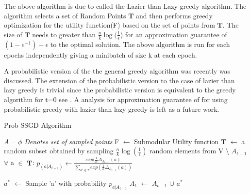 \documentclass[a4paper,twoside]{iiththesis}
\theoremstyle{definition}
\theoremstyle{definition}
\theoremstyle{remark}
\begin{document}
The above algorithm is due to \cite{mirzasoleiman2015lazier} called the Lazier than Lazy greedy algorithm. The algorithm selects a set of Random Points $\mathbf{T}$ and then performs greedy optimization for the utility function(F) based on the set of points from $\mathbf{T}$. The size of  $\mathbf{T}$ needs to greater than $\frac{n}{k} \log(\frac{1}{\epsilon}$)  for an approximation guarantee  of $(1 - e^{-1}) - \epsilon$ to the optimal solution. The above algorithm is run for each epochs independently giving a minibatch of size k at each epoch. 

A probabilistic version of the the general greedy algorithm was recently  \cite{tschiatschek2018differentiable} was discussed. The extension of the probabilistic  version to the case of lazier than lazy greedy is trivial since the probabilistic version is equivalent to the greedy algorithm for t=0 see \cite{tschiatschek2018differentiable}. A analysis for approximation guarantee of  for using probabilistic greedy with lazier than lazy greedy is left as a future work.
\begin{algorithm}[!htb]
\caption{Prob SSGD Algorithm}
\label{sSGD-2}
\begin{algorithmic}[1]
\State $A= \phi$ \Comment \textit{Denotes set of sampled points}
\State  F $\leftarrow$ Submodular Utility function
	\State $\mathbf{T}  $ $\leftarrow$ a random subset obtained by sampling $\frac{n}{k} \log(\frac{1}{\epsilon})$ random
	elements from V $\setminus$ $A_{t-1}$
    \State $\forall$ a $\in$ $\mathbf{T}$: 
    \State 
    $p_{(a | A_{t-1})} \leftarrow \frac{exp(\frac{1}{\alpha} \Delta_{A_{t-1}}(a)} {\sum_{a' \in T} exp(\frac{1}{\alpha} \Delta_{A_{t-1}}(a))}$ \label{prob eq}
   
	\State $a^*$ $\leftarrow$ Sample 'a' with probability $p_{a|A_{t-1}}$
    \State  $A_{t}$ $\leftarrow$ $A_{t-1}$ $\cup$ $a^*$
\EndFor
\State 
\end{algorithmic}
\end{algorithm}
\end{document}
